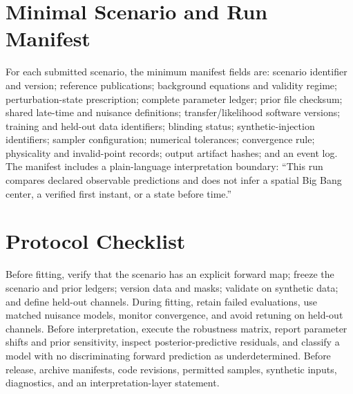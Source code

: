 \documentclass[10pt,conference]{IEEEtran}
\begin{document}
\section{Minimal Scenario and Run Manifest}
\label{app:manifest}

For each submitted scenario, the minimum manifest fields are: scenario identifier and version; reference publications; background equations and validity regime; perturbation-state prescription; complete parameter ledger; prior file checksum; shared late-time and nuisance definitions; transfer/likelihood software versions; training and held-out data identifiers; blinding status; synthetic-injection identifiers; sampler configuration; numerical tolerances; convergence rule; physicality and invalid-point records; output artifact hashes; and an event log. The manifest includes a plain-language interpretation boundary: ``This run compares declared observable predictions and does not infer a spatial Big Bang center, a verified first instant, or a state before time.''

\section{Protocol Checklist}
\label{app:checklist}

Before fitting, verify that the scenario has an explicit forward map; freeze the scenario and prior ledgers; version data and masks; validate on synthetic data; and define held-out channels. During fitting, retain failed evaluations, use matched nuisance models, monitor convergence, and avoid retuning on held-out channels. Before interpretation, execute the robustness matrix, report parameter shifts and prior sensitivity, inspect posterior-predictive residuals, and classify a model with no discriminating forward prediction as underdetermined. Before release, archive manifests, code revisions, permitted samples, synthetic inputs, diagnostics, and an interpretation-layer statement.
\end{document}
